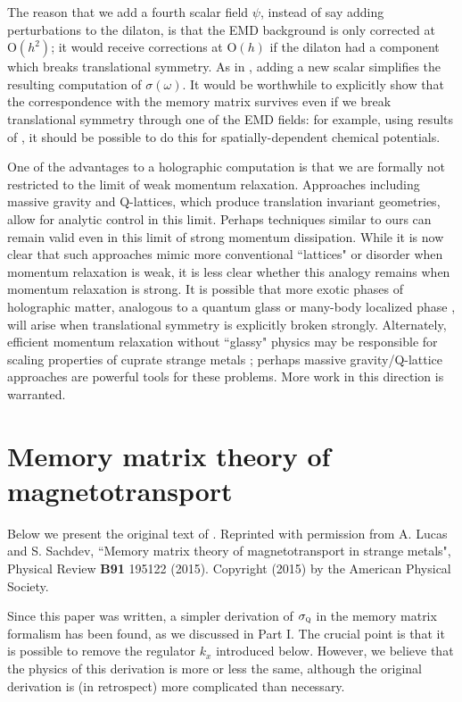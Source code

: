 \documentclass[10pt, oneside]{book}
\begin{document}
\begin{doublespace}
The reason that we add a fourth scalar field $\psi$, instead of say adding perturbations to the dilaton, is that the EMD background is only corrected at $\mathrm{O}(h^2)$;   it would receive corrections at $\mathrm{O}(h)$ if the dilaton had a component which breaks translational symmetry.   As in \cite{Blake:2013owa, lucas1401}, adding a new scalar simplifies the resulting computation of $\sigma(\omega)$.  It would be worthwhile to explicitly show that the correspondence with the memory matrix survives even if we break translational symmetry through one of the EMD fields:  for example, using results of \cite{Donos:2014yya}, it should be possible to do this for spatially-dependent chemical potentials.   

One of the advantages to a holographic computation is that we are formally not restricted to the limit of weak momentum relaxation.    Approaches including massive gravity and Q-lattices, which produce translation invariant geometries, allow for analytic control in this limit.   Perhaps techniques similar to ours can remain valid even in this limit of strong momentum dissipation.  While it is now clear that such approaches mimic more conventional ``lattices" or disorder when momentum relaxation is weak, it is less clear whether this analogy remains when momentum relaxation is strong.   It is possible that more exotic phases of holographic matter, analogous to a quantum glass or many-body localized phase \cite{nandkishore}, will arise when translational symmetry is explicitly broken strongly.  Alternately, efficient momentum relaxation without ``glassy" physics may be responsible for scaling properties of cuprate strange metals \cite{Hartnoll:2015sea};  perhaps massive gravity/Q-lattice approaches are powerful tools for these problems.   More work  in this direction is warranted.


\chapter{Memory matrix theory of magnetotransport}

Below we present the original text of \cite{Lucas:2015pxa}.    Reprinted with permission from A. Lucas and S. Sachdev,  ``Memory matrix theory of magnetotransport in strange metals",  Physical Review \textbf{B91} 195122 (2015).   Copyright (2015) by the American Physical Society.

Since this paper was written, a simpler derivation of $\sigma_{\textsc{q}}$ in the memory matrix formalism has been found, as we discussed in Part I.   The crucial point is that it is possible to remove the regulator $k_x$ introduced below.  However, we believe that the physics of this derivation is more or less the same, although the original derivation is (in retrospect) more complicated than necessary.


\end{doublespace}
\end{document}

